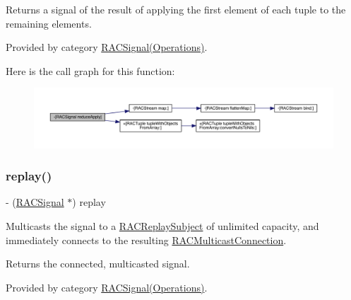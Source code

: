 Returns a signal of the result of applying the first element of each tuple to the remaining elements. 

Provided by category \mbox{\hyperlink{category_r_a_c_signal_07_operations_08_a60241be15dba6de172d2ab14be09b657}{R\+A\+C\+Signal(\+Operations)}}.

Here is the call graph for this function\+:\nopagebreak
\begin{figure}[H]
\begin{center}
\leavevmode
\includegraphics[width=350pt]{interface_r_a_c_signal_a60241be15dba6de172d2ab14be09b657_cgraph}
\end{center}
\end{figure}
\mbox{\label{interface_r_a_c_signal_a6d7d83297f6b837dd5efc18c38483a94}} 
\subsubsection{\texorpdfstring{replay()}{replay()}\hspace{0.1cm}{\footnotesize\ttfamily [1/3]}}
{\footnotesize\ttfamily -\/ (\mbox{\hyperlink{interface_r_a_c_signal}{R\+A\+C\+Signal}} $\ast$) replay \begin{DoxyParamCaption}{ }\end{DoxyParamCaption}}

Multicasts the signal to a \mbox{\hyperlink{interface_r_a_c_replay_subject}{R\+A\+C\+Replay\+Subject}} of unlimited capacity, and immediately connects to the resulting \mbox{\hyperlink{interface_r_a_c_multicast_connection}{R\+A\+C\+Multicast\+Connection}}.

Returns the connected, multicasted signal. 

Provided by category \mbox{\hyperlink{category_r_a_c_signal_07_operations_08_a6d7d83297f6b837dd5efc18c38483a94}{R\+A\+C\+Signal(\+Operations)}}.

